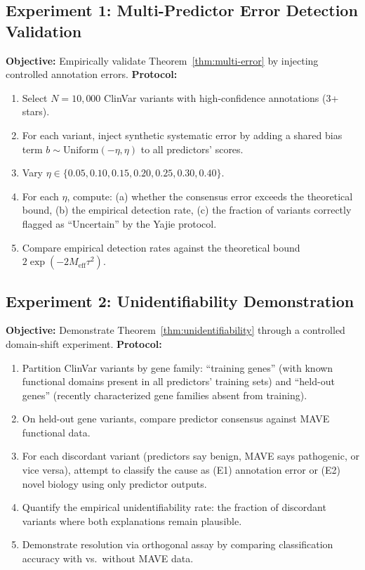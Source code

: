 \documentclass[11pt,a4paper]{article}
\theoremstyle{definition}
\begin{document}
\subsection{Experiment 1: Multi-Predictor Error Detection Validation}
\textbf{Objective:} Empirically validate Theorem~\ref{thm:multi-error} by injecting controlled annotation errors.
\textbf{Protocol:}
\begin{enumerate}[leftmargin=*]
    \item Select $N = 10,000$ ClinVar variants with high-confidence annotations (3+ stars).
    \item For each variant, inject synthetic systematic error by adding a shared bias term $b \sim \text{Uniform}(-\eta, \eta)$ to all predictors' scores.
    \item Vary $\eta \in \{0.05, 0.10, 0.15, 0.20, 0.25, 0.30, 0.40\}$.
    \item For each $\eta$, compute: (a) whether the consensus error exceeds the theoretical bound, (b) the empirical detection rate, (c) the fraction of variants correctly flagged as ``Uncertain'' by the Yajie protocol.
    \item Compare empirical detection rates against the theoretical bound $2\exp(-2M_{\text{eff}}\tau^2)$.
\end{enumerate}
\subsection{Experiment 2: Unidentifiability Demonstration}
\textbf{Objective:} Demonstrate Theorem~\ref{thm:unidentifiability} through a controlled domain-shift experiment.
\textbf{Protocol:}
\begin{enumerate}[leftmargin=*]
    \item Partition ClinVar variants by gene family: ``training genes'' (with known functional domains present in all predictors' training sets) and ``held-out genes'' (recently characterized gene families absent from training).
    \item On held-out gene variants, compare predictor consensus against MAVE functional data.
    \item For each discordant variant (predictors say benign, MAVE says pathogenic, or vice versa), attempt to classify the cause as (E1) annotation error or (E2) novel biology using only predictor outputs.
    \item Quantify the empirical unidentifiability rate: the fraction of discordant variants where both explanations remain plausible.
    \item Demonstrate resolution via orthogonal assay by comparing classification accuracy with vs.\ without MAVE data.
\end{enumerate}
\end{document}
